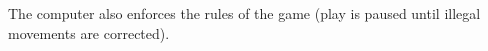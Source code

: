 \documentclass[10pt]{article}
\begin{document}
\begin{itemize}
%
%
 The computer also enforces the rules of the game
(play is paused until illegal movements are corrected).














\end{itemize}
\end{document}

